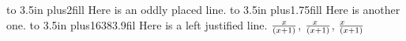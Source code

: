\hbox to 3.5in{\vrule\hskip0pt plus2fill Here is an oddly
placed line.\hfill\vrule}
\hbox to 3.5in{\vrule\hskip0pt plus1.75fill Here is another
one.\hfill\vrule}
\hbox to 3.5in{\vrule\hskip0pt plus16383.9fil Here is a left
justified line.\hfill\vrule}
\baselineskip
$ x\over(x+1)$, $ x\hfil\over(x+1)$, $ x\hfill\over(x+1)$
\bye
